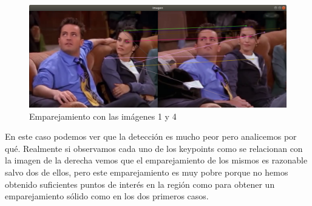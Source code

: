 \documentclass[12pt,a4paper]{article}
\begin{document}
\begin{figure}[H]
  \centering
  \includegraphics[scale=0.35]{./Imagenes/Ejercicio1-3.png}
  \caption{Emparejamiento con las imágenes 1 y 4}
\end{figure}

En este caso podemos ver que la detección es mucho peor pero analicemos por qué. Realmente si observamos cada uno de los keypoints como se relacionan con la imagen de la derecha vemos que el emparejamiento de los mismos es razonable salvo dos de ellos, pero este emparejamiento es muy pobre porque no hemos obtenido suficientes puntos de interés en la región como para obtener un emparejamiento sólido como en los dos primeros casos.
\end{document}
